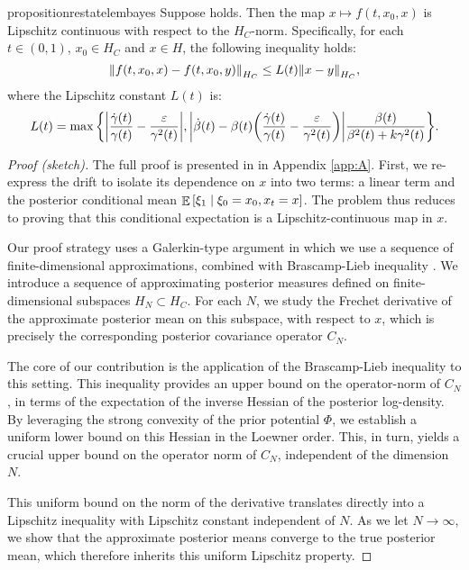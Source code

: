 \begin{theorembox}
  \begin{restatable}{proposition}{restatelembayes}\label{lem:bayes}
    Suppose  holds. Then the map \(x \mapsto f(t, x_{0}, x)\) is Lipschitz continuous with respect to the \(H_{C}\)-norm. Specifically, for each \(t \in (0, 1)\), \(x_{0} \in H_{C}\) and \(x \in H\), the following inequality holds:
    \[
      \norm{f(t, x_{0}, x) - f(t, x_{0}, y)}_{H_{C}} \leq L(t) \norm{x - y}_{H_{C}},
    \]
    where the Lipschitz constant \(L(t)\) is:
    \[
      L(t) =  \mathop{\underset{}{\max}}\qty{\abs{\frac{\dot{\gamma}(t)}{\gamma(t)} - \frac{\varepsilon}{\gamma^{2}(t)}}, \abs{\dot{\beta}(t) - \beta(t)\qty(\frac{\dot{\gamma}(t)}{\gamma(t)} - \frac{\varepsilon}{\gamma^{2}(t)})} \frac{\beta(t)}{\beta^{2}(t) + k \gamma^{2}(t)}}.
    \]
  \end{restatable}
\end{theorembox}
\begin{proof}[Proof (sketch)]
  The full proof is presented in  in Appendix \ref{app:A}.
  First, we re-express the drift to isolate its dependence on \(x\) into two terms: a linear term and the posterior conditional mean \(\mathop{\mathbb{E}}\qty[\xi_{1} \mid \xi_{0} = x_{0}, x_{t}= x]\). The problem thus reduces to proving that this conditional expectation is a Lipschitz-continuous map in \(x\).

  Our proof strategy uses a Galerkin-type argument in which we use a sequence of finite-dimensional approximations, combined with Brascamp-Lieb inequality \citep{brascamp1976extensions}. We introduce a sequence of approximating posterior measures defined on finite-dimensional subspaces \(H_{N} \subset H_{C}\). For each \(N\), we study the Frechet derivative of the approximate posterior mean on this subspace, with respect to \(x\), which is precisely the corresponding posterior covariance operator \(C_{N}\).

  The core of our contribution is the application of the Brascamp-Lieb inequality to this setting. This inequality provides an upper bound on the operator-norm of \(C_{N}\), in terms of the expectation of the inverse Hessian of the posterior log-density. By leveraging the strong convexity of the prior potential \(\Phi\), we establish a uniform lower bound on this Hessian in the Loewner order. This, in turn, yields a crucial upper bound on the operator norm of \(C_{N}\), independent of the dimension \(N\).

  This uniform bound on the norm of the derivative translates directly into a Lipschitz inequality with Lipschitz constant independent of \(N\). As we let \(N \to \infty\), we show that the approximate posterior means converge to the true posterior mean, which therefore inherits this uniform Lipschitz property.
\end{proof}

